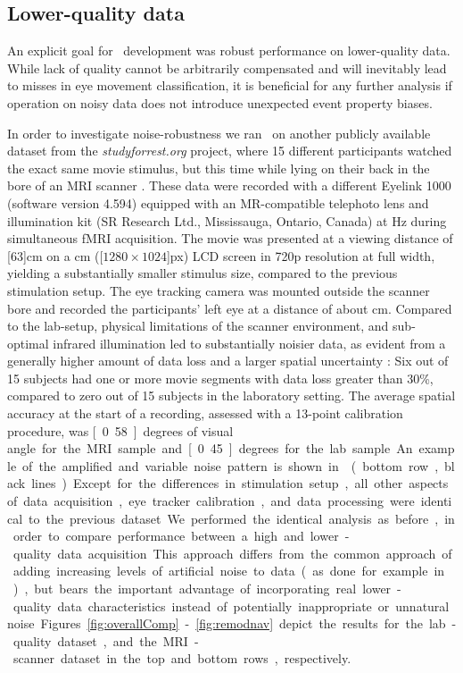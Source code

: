 \subsection*{Lower-quality data}\label{ana_3}

An explicit goal for \remodnav\ development was robust performance on
lower-quality data. While lack of quality cannot be arbitrarily compensated and
will inevitably lead to misses in eye movement classification, it is beneficial for
any further analysis if operation on noisy data does not introduce unexpected
event property biases.

In order to investigate noise-robustness we ran \remodnav\ on another
publicly available dataset from the \textit{studyforrest.org} project, where 15
different participants watched the exact same movie stimulus, but this time
while lying on their back in the bore of an MRI scanner \citep{Hanke2016}.
These data were recorded with a different Eyelink 1000 (software version 4.594)
equipped with an MR-compatible telephoto lens and illumination kit (SR Research
Ltd., Mississauga, Ontario, Canada) at \unit[1000]{Hz} during simultaneous fMRI
acquisition. The movie was presented at a viewing distance of \unit[$63$]{cm}
on a \unit[26]{cm} (\unit[$1280\times1024$]{px}) LCD screen in 720p resolution
at full width, yielding a substantially smaller stimulus size, compared to the
previous stimulation setup. The eye tracking camera was mounted outside the
scanner bore and recorded the participants' left eye at a distance of about
\unit[100]{cm}.  Compared to the lab-setup, physical limitations of the scanner
environment, and sub-optimal infrared illumination led to substantially
noisier data, as evident from a generally higher amount of data loss and a
larger spatial uncertainty \citep[Technical Validation]{Hanke2016}: Six out
of 15 subjects had one or more movie segments with data loss greater than 30\%,
compared to zero out of 15 subjects in the laboratory setting.
The average spatial accuracy at the start of a recording, assessed with a 13-point
calibration procedure, was \unit[0.58]{degrees of visual angle} for the MRI sample and
\unit[0.45]{degrees} for the lab sample.
An example of the amplified and variable noise pattern is shown in  (bottom
row, black lines). Except for the differences in stimulation setup, all other
aspects of data acquisition, eye tracker calibration, and data processing
were identical to the previous dataset.

We performed the identical analysis as before, in order to compare performance
between a high and lower-quality data acquisition. This approach differs from
the common approach of adding increasing levels of artificial noise to data
(as done for example in \citet{hessels2017noise}),
but bears the important advantage of incorporating real lower-quality data
characteristics instead of potentially inappropriate or unnatural noise.
Figures~\ref{fig:overallComp}-\ref{fig:remodnav} depict the results for the
lab-quality dataset, and the MRI-scanner dataset in the top and bottom rows,
respectively.

